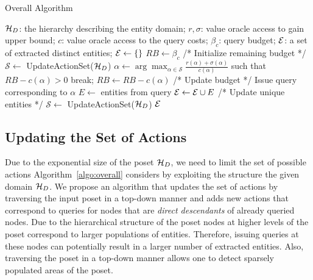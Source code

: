 \begin{algorithm}[h]
\small\caption{Overall Algorithm}
\label{algo:overall}
\begin{algorithmic}[1]
 $\mathcal{H}_D$: the hierarchy describing the entity domain; $r,\sigma$: value oracle access to gain upper bound; $c$: value oracle access to the query costs; $\beta_c$: query budget;
 $\mathcal{E}$: a set of extracted distinct entities;
\STATE $\mathcal{E} \leftarrow \{\}$
\STATE $RB \leftarrow \beta_c$ /* Initialize remaining budget */
\STATE $\mathcal{S} \leftarrow$ {\sf UpdateActionSet($\mathcal{H}_D$)}
	\STATE $\alpha \leftarrow \arg\max_{\alpha \in {\mathcal{S}}} \frac{r(\alpha)+\sigma(\alpha)}{c(\alpha)}$ such that $RB - c(\alpha) >0$
		\STATE break;
	\ENDIF
	\STATE $RB \leftarrow RB - c(\alpha)$ /* Update budget */
	\STATE Issue query corresponding to $\alpha$
	\STATE $E \leftarrow$ entities from query
	\STATE $\mathcal{E} \leftarrow \mathcal{E} \cup E$ /* Update unique entities */
	\STATE $\mathcal{S} \leftarrow$ {\sf UpdateActionSet($\mathcal{H}_D$)}
\ENDWHILE
\RETURN $\mathcal{E}$
\end{algorithmic}
\end{algorithm}

\subsection{Updating the Set of Actions}
Due to the exponential size of the poset $\mathcal{H}_D$, we need to limit the set of possible actions Algorithm~\ref{algo:overall} considers by exploiting the structure the given domain $\mathcal{H}_D$. We propose an algorithm that updates the set of actions by traversing the input poset in a top-down manner and adds new actions that correspond to queries for nodes that are {\em direct descendants} of already queried nodes. Due to the hierarchical structure of the poset nodes at higher levels of the poset correspond to larger populations of entities. Therefore, issuing queries at these nodes can potentially result in a larger number of extracted entities. Also, traversing the poset in a top-down manner allows one to detect sparsely populated areas of the poset.

